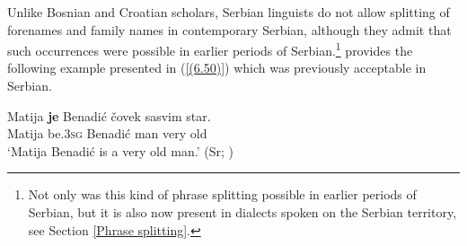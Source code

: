 \noindent Unlike Bosnian and Croatian scholars, Serbian linguists \citep[e.g.][319]{Popovic04} do not allow splitting of forenames and family names in contemporary Serbian, although they admit that such occurrences were possible in earlier periods of Serbian.\footnote{Not only was this kind of phrase splitting possible in earlier periods of Serbian, but it is also now present in dialects spoken on the Serbian territory, see Section \ref{Phrase splitting}.} \citet[][306]{Pesikan58} provides the following example presented in (\ref{(6.50)}) which was previously acceptable in Serbian.

\begin{exe}\ex\label{(6.50)}
\gll Matija \textbf{je} Benadić čovek sasvim star.\\
 Matija be\textsc{.3sg} Benadić man very old\\
\glt ‘Matija Benadić is a very old man.’
\hfill  (Sr; \citealt[306]{Pesikan58})
\end{exe}

